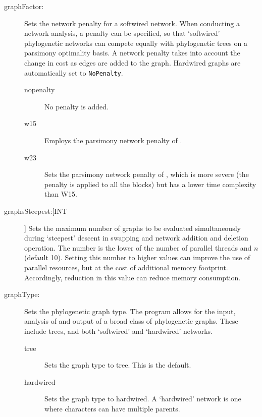 \begin{description}
\begin{description}
		\end{description}
			
		\item[graphFactor:] Sets the network penalty for a softwired network. When conducting 
		a network analysis, a penalty can be specified, so that ‘softwired’ phylogenetic networks 
		can compete equally with phylogenetic trees on a parsimony optimality basis. A network 
		penalty takes into account the change in cost as edges are added to the graph. Hardwired 
		graphs are automatically set to \texttt{NoPenalty}.
			
		\begin{description}
			
			\item[nopenalty] No penalty is added.	

			\item[w15] Employs the parsimony network penalty of \cite{Wheeler2015}.	
		
			\item[w23] Sets the parsimony network penalty of \cite{WheelerandWashburn2023}, 
			which is more severe (the penalty is applied to all the blocks) but has a lower time 
			complexity than W15.		

		\end{description}
			
		\item[graphsSteepest:[INT]] Sets the maximum number of graphs to be evaluated 
		simultaneously during `steepest' descent in swapping and network addition and 
		deletion operation. The number is the lower of the number of parallel threads 
		and $n$ (default 10).  Setting this number to higher values can improve the use of 
		parallel resources, but at the cost of additional memory footprint. Accordingly, 
		reduction in this value can reduce memory consumption.
			
		\item[graphType:] Sets the phylogenetic graph type. The program allows for the input, 
		analysis of and output of a broad class of phylogenetic graphs. These include trees, 
		and both `softwired’ and `hardwired’ networks. 
			
		\begin{description}
			
			\item[tree] Sets the graph type to tree. This is the default.
		
			\item[hardwired]  Sets the graph type to hardwired. A `hardwired' network is 
			one where characters can have multiple parents.
	

\end{description}
\end{description}
